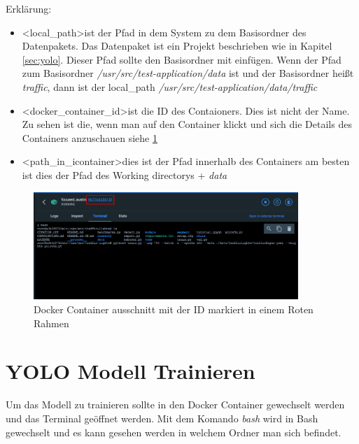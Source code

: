 Erklärung:
\begin{itemize}
    \item \textless local\_path\textgreater ist der Pfad in dem System zu dem Basisordner des Datenpakets. Das Datenpaket ist ein Projekt beschrieben wie in Kapitel \ref{sec:yolo}. Dieser Pfad sollte den Basisordner mit einfügen. Wenn der Pfad zum Basisordner \textit{/usr/src/test-application/data} ist und der Basisordner heißt \textit{traffic}, dann ist der local\_path \textit{/usr/src/test-application/data/traffic}
    \item \textless docker\_container\_id\textgreater ist die ID des Contaioners. Dies ist nicht der Name. Zu sehen ist die, wenn man auf den Container klickt und sich die Details des Containers anzuschauen siehe \ref{fig:doc_cont_term}
    \item \textless path\_in\_icontainer\textgreater dies ist der Pfad innerhalb des Containers am besten ist dies der Pfad des Working directorys + \textit{data}
\end{itemize}

\begin{figure}
    \centering
    \includegraphics[width=10cm]{data/img/docker_container_terminal.png}
    \caption{Docker Container ausschnitt mit der ID markiert in einem Roten Rahmen}
    \label{fig:doc_cont_term}
\end{figure}

\section{YOLO Modell Trainieren}
Um das Modell zu trainieren sollte in den Docker Container gewechselt werden und das Terminal geöffnet werden. Mit dem Komando \textit{bash} wird in Bash gewechselt und es kann gesehen werden in welchem Ordner man sich befindet. 

